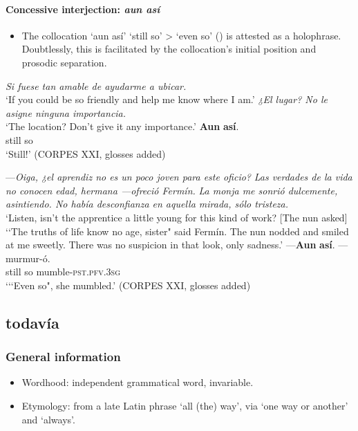 \paragraph{Concessive interjection: \textit{aun así}}
\label{appendixSpanishAunAsinterjection}
\begin{itemize}
	\item The collocation \lq aun así' \lq still so' > \lq even so' () is attested as a holophrase. Doubtlessly, this is facilitated by the collocation's initial position and prosodic separation.
\end{itemize}
\largerpage
\begin{exe}
	\ex
	\begin{xlist}
		 \textit{Si fuese tan amable de ayudarme a ubicar.}\\
		\lq If you could be so friendly and help me know where I am.'
		\textit{¿El lugar? No le asigne ninguna importancia.}\\
		\lq The location? Don't give it any importance.'
		\gll \textbf{Aun} \textbf{así}.\\
		still so\\
		\glt \lq Still!' (CORPES XXI, glosses added)
	\end{xlist}
	
	\ex —\textit{Oiga, ¿el aprendiz no es un poco joven para este oficio?} \textit{Las verdades de la vida no conocen edad, hermana —ofreció Fermín.} \textit{La monja me sonrió dulcemente, asintiendo. No había desconfianza en aquella mirada, sólo tristeza.}\\
	\lq Listen, isn't the apprentice a little young for this kind of work? [The nun asked] \lq\lq The truths of life know no age, sister" said Fermín. The nun nodded and smiled at me sweetly. There was no suspicion in that look, only sadness.'
	\exi{}\gll —\textbf{Aun} \textbf{así}. —murmur-ó.\\
	\phantom{—}still so \phantom{—}mumble-\textsc{pst}.\textsc{pfv}.3\textsc{sg}\\
	\glt \lq {\lq\lq}Even so", she mumbled.' (CORPES XXI, glosses added)
\end{exe}

\subsection{todavía}
\label{appendixSpanishTodavia}
\subsubsection{General information}
\begin{itemize}
	\item Wordhood: independent grammatical word, invariable.
	\item Etymology: from a late Latin phrase \lq all (the) way', via \lq one way or another' and \lq always'.
\end{itemize}


